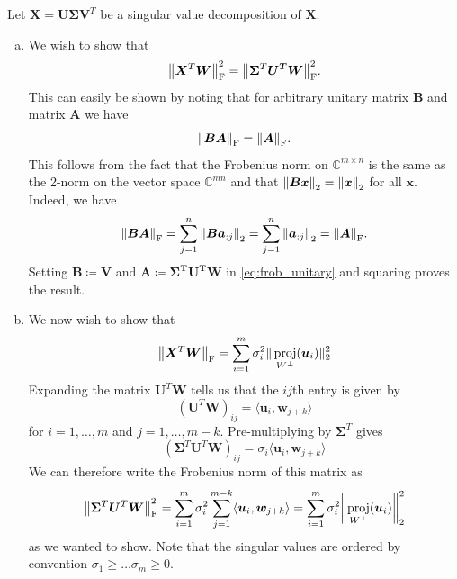 \documentclass[article, a4paper, oneside, 12pt]{memoir}
\DeclareMathOperator{\proj}{proj}
\newcommand{\mat}[1]{\bm{#1}}
\newcommand{\frob}[1]{\norm{#1}_{\mathrm{F}}}
\begin{document}
Let \( \mat{X} = \mat{U}\mat{\Sigma}\mat{V}^T \) be a singular value
decomposition of \( \mat{X} \). 
\begin{enumerate}[a)]
    \item We wish to show that
\begin{equation}
    \frob{\mat{X}^T \mat{W}}^2 = \frob{\mat{\Sigma}^T\mat{U^T}\mat{W}}^2.
\end{equation}
This can easily be shown by noting that for arbitrary unitary matrix \( \mat{B}
\) and matrix \( \mat{A} \) we  have
\begin{equation}
    \label{eq:frob_unitary}
    \frob{\mat{BA}} = \frob{\mat{A}}.
\end{equation}
This follows from the fact that the Frobenius norm on \( \mathbb{C}^{m\times n}
\) is the same as the 2-norm on the vector space \( \mathbb{C}^{mn} \) and that
\( \norm{\mat{Bx} }_2 = \norm{ \mat{x} }_2 \) for all \( \mat{x} \).  Indeed, we
have
\begin{align}
    \frob{\mat{BA}} = \sum_{j = 1}^n \norm{ \mat{Ba}_{:j}}_2 = \sum_{j = 1}^n \norm {
    \mat{a}_{:j} }_2 = \frob{\mat{A}}.
\end{align}
Setting \( \mat{B} \coloneqq \mat{V} \) and \( \mat{A} \coloneqq \mat{\Sigma^T
U^T W}\) in \cref{eq:frob_unitary} and squaring proves the result.  

\item We now wish
to show that
\begin{equation}
    \frob{\mat{X}^T\mat{W}} = \sum_{i=1}^m
    \sigma_i^2\|\proj_{W^\perp}(\mat{u}_i)\|_2^2
\end{equation}
Expanding the matrix \( \mat{U}^T\mat{W} \) tells us that the \(ij\)th entry is
given by
\begin{equation}
    (\mat{U}^T\mat{W})_{ij} = \langle \mat{u}_i, \mat{w}_{j + k}\rangle
\end{equation}
for \( i = 1, \ldots, m \) and \( j = 1, \ldots, m - k \). Pre-multiplying by
\( \mat{\Sigma}^T \) gives
\begin{equation}
    (\mat{\Sigma}^T\mat{U}^T\mat{W})_{ij} = \sigma_i \langle \mat{u}_i, \mat{w}_{j+k} \rangle
\end{equation}
We can therefore write the Frobenius norm of this matrix as
\begin{align*}
    \frob{\mat{\Sigma}^T\mat{U}^T\mat{W}}^2 = \sum_{i=1}^m \sigma_i^2
    \sum_{j=1}^{m-k} \langle \mat{u}_i, \mat{w}_{j+k}\rangle  = \sum_{i=1}^m
    \sigma_i^2 \norm{\proj_{W^\perp}(\mat{u}_i)}_2^2
\end{align*}
as we wanted to show. Note that the singular values are ordered by convention
\( \sigma_1 \geq \ldots \sigma_m \geq 0 \).



\end{enumerate}
\end{document}
